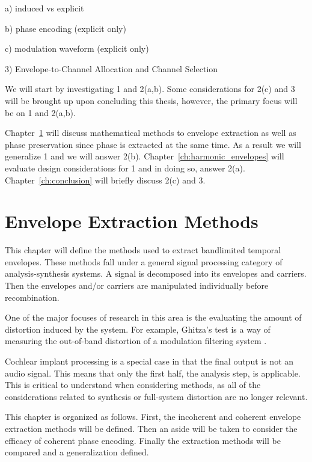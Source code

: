 \documentclass [11pt, proquest,oneside] {ganter_thesis}[2015/03/03]
\begin{document}
a) induced vs explicit

b) phase encoding (explicit only)

c) modulation waveform (explicit only)

3) Envelope-to-Channel Allocation and Channel Selection

We will start by investigating 1 and 2(a,b).  Some considerations for 2(c) and 3 will be brought up upon concluding this thesis, however, the primary focus will be on 1 and 2(a,b).

Chapter~\ref{ch:envelope_extraction} will discuss mathematical methods to envelope extraction as well as phase preservation since phase is extracted at the same time.  As a result we will generalize 1 and we will answer 2(b).  Chapter~\ref{ch:harmonic_envelopes} will evaluate design considerations for 1 and in doing so, answer 2(a).  Chapter~\ref{ch:conclusion} will briefly discuss 2(c) and 3.


\chapter{Envelope Extraction Methods}\label{ch:envelope_extraction}

This chapter will define the methods used to extract bandlimited temporal envelopes.  These methods fall under a general signal processing category of analysis-synthesis systems.  A signal is decomposed into its envelopes and carriers.  Then the envelopes and/or carriers are manipulated individually before recombination. 

One of the major focuses of research in this area is the evaluating the amount of distortion induced by the system.  For example, Ghitza's test is a way of measuring the out-of-band distortion of a modulation filtering system \cite{ghitza2001upper}.

Cochlear implant processing is a special case in that the final output is not an audio signal.  This means that only the first half, the analysis step, is applicable.  This is critical to understand when considering methods, as all of the considerations related to synthesis or full-system distortion are no longer relevant.

This chapter is organized as follows.  First, the incoherent and coherent envelope extraction methods will be defined.  Then an aside will be taken to consider the efficacy of coherent phase encoding.  Finally the extraction methods will be compared and a generalization defined.
\end{document}
